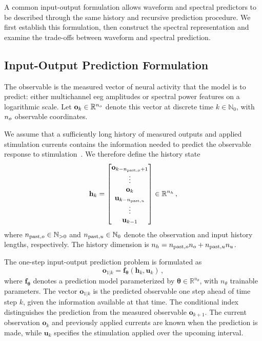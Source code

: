 A common input-output formulation allows waveform and spectral predictors to be described through the same history and recursive prediction procedure.
We first establish this formulation, then construct the spectral representation and examine the trade-offs between waveform and spectral prediction.

\subsection{Input-Output Prediction Formulation}

The observable is the measured vector of neural activity that the model is to predict: either multichannel \ac{eeg} amplitudes or spectral power features on a logarithmic scale.
Let $\mathbf{o}_k\in\mathbb{R}^{n_{o}}$ denote this vector at discrete time $k\in\mathbb N_0$, with $n_{o}$ observable coordinates.

We assume that a sufficiently long history of measured outputs and applied stimulation currents contains the information needed to predict the observable response to stimulation~\cite{Ljung1999}.
We therefore define the history state
\begin{equation}
    \mathbf{h}_k =
    \begin{bmatrix}
        \mathbf{o}_{k-n_{\mathrm{past},o}+1}\\
        \vdots\\
        \mathbf{o}_k\\
        \mathbf{u}_{k-n_{\mathrm{past},u}}\\
        \vdots\\
        \mathbf{u}_{k-1}
    \end{bmatrix}
    \in \mathbb{R}^{n_{h}}\,,
    \label{eq:predictor_history}
\end{equation}
where $n_{\mathrm{past},o}\in\mathbb N_{>0}$ and $n_{\mathrm{past},u}\in\mathbb N_0$ denote the observation and input history lengths, respectively.
The history dimension is $n_{h}=n_{\mathrm{past},o}n_{o}+n_{\mathrm{past},u}n_{u}$.

The one-step input-output prediction problem is formulated as
\begin{equation}
    \mathbf{o}_{1|k}
    =
    \mathbf{f}_{\boldsymbol{\theta}}
    \left(\mathbf{h}_k,\mathbf{u}_k\right)\,,
    \label{eq:one_step_predictor}
\end{equation}
where $\mathbf{f}_{\boldsymbol{\theta}}$ denotes a prediction model parameterized by $\boldsymbol{\theta}\in\mathbb{R}^{n_\theta}$, with $n_\theta$ trainable parameters.
The vector $\mathbf{o}_{1|k}$ is the predicted observable one step ahead of time step $k$, given the information available at that time.
The conditional index distinguishes the prediction from the measured observable $\mathbf{o}_{k+1}$.
The current observation $\mathbf{o}_k$ and previously applied currents are known when the prediction is made, while $\mathbf{u}_k$ specifies the stimulation applied over the upcoming interval.

